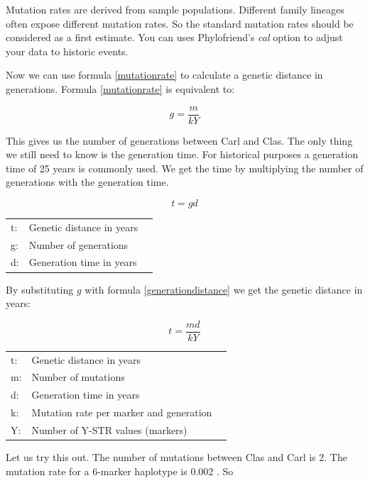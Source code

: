 Mutation rates are derived from sample populations. Different
family lineages often expose different mutation rates. So the
standard mutation rates should be considered as a first 
estimate. You can uses Phylofriend's \emph{cal} option to
adjust your data to historic events.

Now we can use formula \ref{mutationrate} to calculate a
genetic distance in generations. Formula \ref{mutationrate}
is equivalent to:

\begin{equation}
g = \frac{m}{k Y} \label{generationdistance}
\end{equation}

This gives us the number of generations between Carl and Clas.
The only thing we still need to know is the generation time.
For historical purposes a generation time of 25 years is
commonly used. We get the time by multiplying the number
of generations with the generation time.

\begin{equation}
t = g d 
\end{equation}

\begin{tabular}{lll}
t: &  Genetic distance in years\\
g: &  Number of generations \\
d: &  Generation time in years
\end{tabular}
\vspace{1em}

By substituting $g$ with formula \ref{generationdistance}
we get the genetic distance in years:

\begin{equation}
t = \frac{m d}{k Y}
\end{equation}

\begin{tabular}{lll}
t: &  Genetic distance in years\\
m: &  Number of mutations \\
d: &  Generation time in years\\
k: &  Mutation rate per marker and generation\\
Y: &  Number of Y-STR values (markers)
\end{tabular}
\vspace{1em}

Let us try this out. The number of mutations between Clas
and Carl is 2. The mutation rate for a 6-marker haplotype
is 0.002 \cite{Kly09}. So

